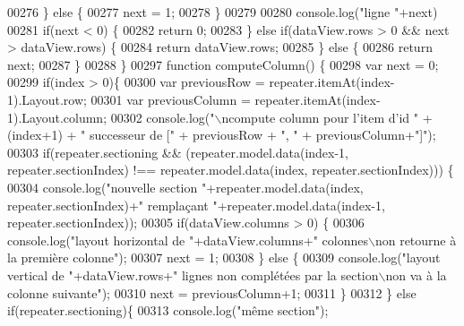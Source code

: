 \begin{DoxyCode}
{00276                 \} \textcolor{keywordflow}{else} \{
00277                     next = 1;
00278                 \}
00279 
00280                 console.log(\textcolor{stringliteral}{"ligne "}+next)
00281                 \textcolor{keywordflow}{if}(next < 0) \{
00282                     \textcolor{keywordflow}{return} 0;
00283                 \} \textcolor{keywordflow}{else} \textcolor{keywordflow}{if}(dataView.rows > 0 && next > dataView.rows) \{
00284                     \textcolor{keywordflow}{return} dataView.rows;
00285                 \} \textcolor{keywordflow}{else} \{
00286                     \textcolor{keywordflow}{return} next;
00287                 \}
00288             \}
00297             \textcolor{keyword}{function} computeColumn() \{
00298                 var next = 0;
00299                 \textcolor{keywordflow}{if}(index > 0)\{
00300                     var previousRow = repeater.itemAt(index-1).Layout.row;
00301                     var previousColumn = repeater.itemAt(index-1).Layout.column;
00302                     console.log(\textcolor{stringliteral}{"\(\backslash\)ncompute column pour l'item d'id "} + (index+1) + \textcolor{stringliteral}{" successeur de ["} + 
      previousRow + \textcolor{stringliteral}{", "} + previousColumn+\textcolor{stringliteral}{"]"});
00303                     \textcolor{keywordflow}{if}(repeater.sectioning && (repeater.model.data(index-1, repeater.sectionIndex) !== 
      repeater.model.data(index, repeater.sectionIndex))) \{
00304                         console.log(\textcolor{stringliteral}{"nouvelle section "}+repeater.model.data(index, repeater.sectionIndex)+\textcolor{stringliteral}{"
       remplaçant "}+repeater.model.data(index-1, repeater.sectionIndex));
00305                         \textcolor{keywordflow}{if}(dataView.columns > 0) \{
00306                             console.log(\textcolor{stringliteral}{"layout horizontal de "}+dataView.columns+\textcolor{stringliteral}{" colonnes\(\backslash\)non retourne à
       la première colonne"});
00307                             next = 1;
00308                         \} \textcolor{keywordflow}{else} \{
00309                             console.log(\textcolor{stringliteral}{"layout vertical de "}+dataView.rows+\textcolor{stringliteral}{" lignes non complétées par la
       section\(\backslash\)non va à la colonne suivante"});
00310                             next = previousColumn+1;
00311                         \}
00312                     \} \textcolor{keywordflow}{else} \textcolor{keywordflow}{if}(repeater.sectioning)\{
00313                         console.log(\textcolor{stringliteral}{"même section"});
}
\end{DoxyCode}
